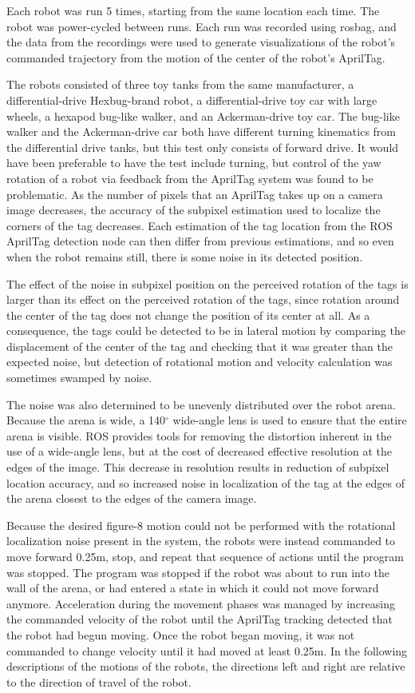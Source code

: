 Each robot was run 5 times, starting from the same location each time. The robot was power-cycled between runs. Each run was recorded using rosbag, and the data from the recordings were used to generate visualizations of the robot's commanded trajectory from the motion of the center of the robot's AprilTag.

The robots consisted of three toy tanks from the same manufacturer, a differential-drive Hexbug-brand robot, a differential-drive toy car with large wheels, a hexapod bug-like walker, and an Ackerman-drive toy car. 
The bug-like walker and the Ackerman-drive car both have different turning kinematics from the differential drive tanks, but this test only consists of forward drive.
It would have been preferable to have the test include turning, but control of the yaw rotation of a robot via feedback from the AprilTag system was found to be problematic. 
As the number of pixels that an AprilTag takes up on a camera image decreases, the accuracy of the subpixel estimation used to localize the corners of the tag decreases. 
Each estimation of the tag location from the ROS AprilTag detection node can then differ from previous estimations, and so even when the robot remains still, there is some noise in its detected position. 

The effect of the noise in subpixel position on the perceived rotation of the tags is larger than its effect on the perceived rotation of the tags, since rotation around the center of the tag does not change the position of its center at all. 
As a consequence, the tags could be detected to be in lateral motion by comparing the displacement of the center of the tag and checking that it was greater than the expected noise, but detection of rotational motion and velocity calculation was sometimes swamped by noise. 

The noise was also determined to be unevenly distributed over the robot arena. Because the arena is wide, a 140$^{\circ}$ wide-angle lens is used to ensure that the entire arena is visible. 
ROS provides tools for removing the distortion inherent in the use of a wide-angle lens, but at the cost of decreased effective resolution at the edges of the image. 
This decrease in resolution results in reduction of subpixel location accuracy, and so increased noise in localization of the tag at the edges of the arena closest to the edges of the camera image. 

Because the desired figure-8 motion could not be performed with the rotational localization noise present in the system, the robots were instead commanded to move forward 0.25m, stop, and repeat that sequence of actions until the program was stopped. 
The program was stopped if the robot was about to run into the wall of the arena, or had entered a state in which it could not move forward anymore. 
Acceleration during the movement phases was managed by increasing the commanded velocity of the robot until the AprilTag tracking detected that the robot had begun moving. 
Once the robot began moving, it was not commanded to change velocity until it had moved at least 0.25m.
In the following descriptions of the motions of the robots, the directions left and right are relative to the direction of travel of the robot. 

